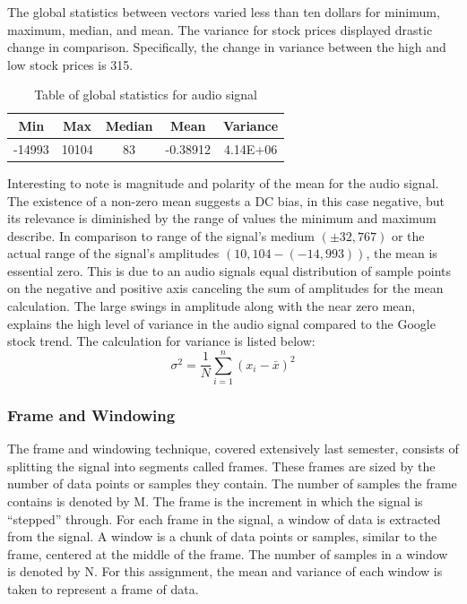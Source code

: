 \documentclass[11pt]{article}
\begin{document}
The global statistics between vectors varied less than ten dollars for minimum, maximum, median, and mean. The variance for stock prices displayed drastic change in comparison. Specifically, the change in variance between the high and low stock prices is 315. 

\begin{table}[H] %
  \centering
    \begin{tabular}{ccccc}
    \toprule
    \textbf{Min} & \textbf{Max} & \textbf{Median} & \textbf{Mean} & \textbf{Variance} \\
    \midrule
    -14993 & 10104 & 83 &  -0.38912   & 4.14E+06 \\
    \bottomrule
    \end{tabular}%
  \caption{Table of global statistics for audio signal}
  \label{tab: table_2}%
\end{table}%

Interesting to note is magnitude and polarity of the mean for the audio signal. The existence of a non-zero mean suggests a DC bias, in this case negative, but its relevance is diminished by the range of values the minimum and maximum  describe. In comparison to range of the signal's medium $(\pm32,767)$ or the actual range of the signal's amplitudes $(10,104 - (- 14,993))$, the mean is essential zero. This is due to an audio signals equal distribution of sample points on the negative and positive axis canceling the sum of amplitudes for the mean calculation. The large swings in amplitude along with the near zero mean, explains the high level of variance in the audio signal compared to the Google stock trend. The calculation for variance is listed below: 
\begin{equation}
\sigma^2 = \frac{1}{N}\sum_{i=1}^{n}(x_i - \bar{x})^2
\end{equation}


\subsubsection{Frame and Windowing}
The frame and windowing technique, covered extensively last semester, consists of splitting the signal into segments called frames. These frames are sized by the number of data points or samples they contain. The number of samples the frame contains is denoted by M. The frame is the increment in which the signal is ``stepped'' through. For each frame in the signal, a window of data is extracted from the signal. A window is a chunk of data points or samples, similar to the frame, centered at the middle of the frame. The number of samples in a window is denoted by N. For this assignment, the mean and variance of each window is taken to represent a frame of data. 
\end{document}
